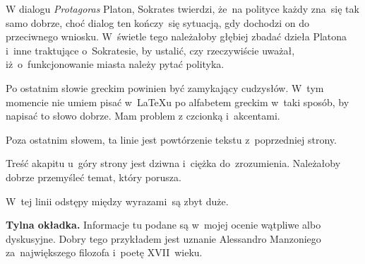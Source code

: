 \documentclass[a4paper,11pt]{article}
\begin{document}
\start {} W dialogu \emph{Protagoras} Platon, Sokrates
twierdzi, że~na polityce każdy zna~się tak samo dobrze, choć dialog
ten kończy~się sytuacją, gdy dochodzi on do przeciwnego wniosku.
W~świetle tego należałoby głębiej zbadać dzieła Platona i~inne
traktujące o~Sokratesie, by ustalić, czy rzeczywiście uważał,
iż~o~funkcjonowanie miasta należy pytać polityka.

\vspace{\spaceFour}


\start {} Po ostatnim słowie greckim powinien być
zamykający cudzysłów. W~tym momencie nie umiem pisać w~\LaTeX u po
alfabetem greckim w~taki sposób, by napisać to słowo dobrze. Mam
problem z czcionką i~akcentami.

\vspace{\spaceFour}


\start {} Poza ostatnim słowem, ta linie jest powtórzenie
tekstu z~poprzedniej strony.

\vspace{\spaceFour}


\start {} Treść akapitu u~góry strony jest dziwna i~ciężka
do~zrozumienia. Należałoby dobrze przemyśleć temat, który porusza.

\vspace{\spaceFour}


\start {} W~tej linii odstępy między wyrazami~są zbyt
duże.

\vspace{\spaceFour}


\start \textbf{Tylna okładka.} Informacje tu podane są w~mojej ocenie
wątpliwe albo dyskusyjne. Dobry tego przykładem jest uznanie
Alessandro Manzoniego za~największego filozofa i~poetę XVII~wieku.

\vspace{\spaceFour}
\end{document}

